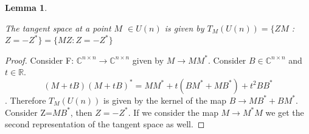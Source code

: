 \documentclass[11pt]{amsart}
\theoremstyle{plain}
\newtheorem{lemma}[theorem]{Lemma}
\theoremstyle{definition}
\theoremstyle{remark}
\begin{document}
 


       \begin{lemma}\label{tsp}
           
    
           The tangent space at a point $M$ $\in U(n)$ is given by $T_{M}(U(n))=\lbrace ZM$ : $Z=-Z^* \rbrace=\{MZ: Z=-Z^*\}$
           
       \end{lemma}
   \begin{proof}
       Consider F: $\mathbb{C}^{n \times n} \to \mathbb{C}^{n\times n}$ given by $M \to MM^*$. Consider $B\in \mathbb{C}^{n\times n}$ and $t \in \mathbb{R}$. $$(M+tB)(M+tB)^*=MM^* +t(BM^* +MB^*) +t^2BB^*$$.
       Therefore $T_{M}(U(n))$ is given by the kernel of the map $B\to MB^*+BM^*$. Consider Z=$MB^*$, then $Z=-Z^*$. If we consider the map $M\to M^*M$ we get the second representation of the tangent space as well.
       
   \end{proof}
 
\end{document}
